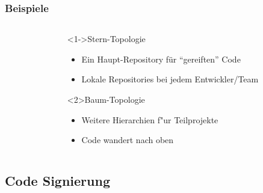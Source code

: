 \documentclass[german]{beamer}
\begin{document}
\begin{frame}
  \frametitle{Beispiele}
  \begin{columns}
    \begin{column}{0.5\textwidth}
      \begin{flushleft}
      \end{flushleft}
    \end{column}
    \begin{column}{0.5\textwidth}
      \begin{block}<1->{Stern-Topologie}
        \begin{itemize}
        \item Ein Haupt-Repository f\"ur "`gereiften"' Code
        \item Lokale Repositories bei jedem Entwickler/Team
        \end{itemize}
      \end{block}
      \begin{block}<2>{Baum-Topologie}
        \begin{itemize}
        \item Weitere Hierarchien f"ur Teilprojekte
        \item Code wandert nach oben
        \end{itemize}
      \end{block}
    \end{column}
  \end{columns}
\end{frame}

\subsection{Code Signierung}
\end{document}
